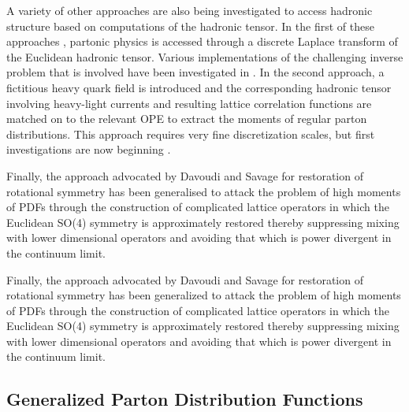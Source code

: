 A variety of other approaches are also being investigated to access hadronic structure \cite{Liu:1993cv,Aglietti:1998mz,Detmold:2005gg,Liu:2016djw} based on computations of the hadronic tensor. In the first of these approaches \cite{Liu:1993cv,Liu:2016djw}, partonic physics is accessed through a discrete Laplace transform of the Euclidean hadronic tensor. Various implementations of the challenging inverse problem that is involved have been investigated in \cite{Liang:2017mye}. In the second approach, a fictitious heavy quark field is introduced and the corresponding hadronic tensor involving heavy-light currents and resulting lattice correlation functions are matched on to the relevant OPE to extract the moments of regular parton distributions. This approach requires very fine discretization scales, but first investigations are now beginning \cite{Detmold:2018kwu}. 


Finally, the approach advocated by Davoudi and Savage \cite{Davoudi:2012ya} for restoration of rotational symmetry has been generalised to attack the 
problem of high moments of PDFs through the construction of complicated lattice operators in which the Euclidean SO(4) symmetry is approximately restored thereby suppressing mixing with lower dimensional operators and avoiding that which is power divergent in the continuum limit. 

Finally, the approach advocated by Davoudi and Savage for restoration of rotational symmetry has been generalized to attack the 
problem of high moments of PDFs through the construction of complicated lattice operators in which the Euclidean SO(4) symmetry is approximately restored thereby suppressing mixing with lower dimensional operators and avoiding that which is power divergent in the continuum limit.


\subsection{Generalized Parton Distribution Functions}

%	

